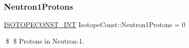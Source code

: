 \subsubsection{\texorpdfstring{Neutron1\+Protons}{Neutron1Protons}}
{\footnotesize\ttfamily \mbox{\hyperlink{group___isotope_const-_macros_ga5f18360b3e99483a35c32d789e62621c}{I\+S\+O\+T\+O\+P\+E\+C\+O\+N\+S\+T\+\_\+\+I\+NT}} Isotope\+Const\+::\+Neutron1\+Protons = 0}

\$ \$ Protons in Neutron-\/1. 